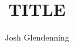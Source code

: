 \documentclass[11pt]{article}
\title{TITLE}
\author{Josh Glendenning}
\begin{document}
\maketitle

{}

\end{document}
